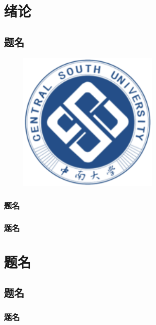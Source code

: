 
\section{绪论} %
\subsection{题名} %
\lipsum

\begin{figure}
    \begin{center}
        \includegraphics[width=7cm]{figures/csu.png}
        \label{fig:logo-csu}
    \end{center}
\end{figure}

\subsubsection{题名} %
\lipsum
\subsubsection{题名} %
\lipsum
\newpage

\section{题名}
\lipsum
\subsection{题名}
\subsubsection{题名}
\lipsum

